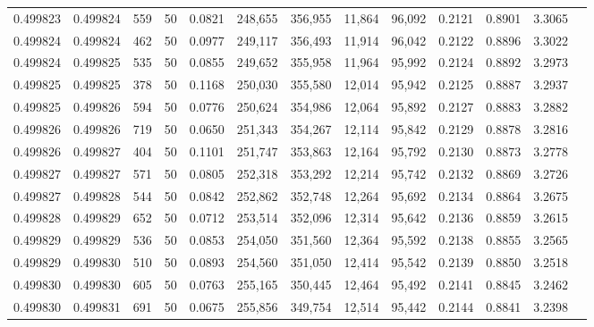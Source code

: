 \begin{tabular}{rrrrrrrrrrrrr}
0.499823 & 0.499824 &   559 &  50 &                                     0.0821 & 248,655 & 356,955 &  11,864 &  96,092 & 0.2121 & 0.8901 & 3.3065 \\
0.499824 & 0.499824 &   462 &  50 &                                     0.0977 & 249,117 & 356,493 &  11,914 &  96,042 & 0.2122 & 0.8896 & 3.3022 \\
0.499824 & 0.499825 &   535 &  50 &                                     0.0855 & 249,652 & 355,958 &  11,964 &  95,992 & 0.2124 & 0.8892 & 3.2973 \\
0.499825 & 0.499825 &   378 &  50 &                                     0.1168 & 250,030 & 355,580 &  12,014 &  95,942 & 0.2125 & 0.8887 & 3.2937 \\
0.499825 & 0.499826 &   594 &  50 &                                     0.0776 & 250,624 & 354,986 &  12,064 &  95,892 & 0.2127 & 0.8883 & 3.2882 \\
0.499826 & 0.499826 &   719 &  50 &                                     0.0650 & 251,343 & 354,267 &  12,114 &  95,842 & 0.2129 & 0.8878 & 3.2816 \\
0.499826 & 0.499827 &   404 &  50 &                                     0.1101 & 251,747 & 353,863 &  12,164 &  95,792 & 0.2130 & 0.8873 & 3.2778 \\
0.499827 & 0.499827 &   571 &  50 &                                     0.0805 & 252,318 & 353,292 &  12,214 &  95,742 & 0.2132 & 0.8869 & 3.2726 \\
0.499827 & 0.499828 &   544 &  50 &                                     0.0842 & 252,862 & 352,748 &  12,264 &  95,692 & 0.2134 & 0.8864 & 3.2675 \\
0.499828 & 0.499829 &   652 &  50 &                                     0.0712 & 253,514 & 352,096 &  12,314 &  95,642 & 0.2136 & 0.8859 & 3.2615 \\
0.499829 & 0.499829 &   536 &  50 &                                     0.0853 & 254,050 & 351,560 &  12,364 &  95,592 & 0.2138 & 0.8855 & 3.2565 \\
0.499829 & 0.499830 &   510 &  50 &                                     0.0893 & 254,560 & 351,050 &  12,414 &  95,542 & 0.2139 & 0.8850 & 3.2518 \\
0.499830 & 0.499830 &   605 &  50 &                                     0.0763 & 255,165 & 350,445 &  12,464 &  95,492 & 0.2141 & 0.8845 & 3.2462 \\
0.499830 & 0.499831 &   691 &  50 &                                     0.0675 & 255,856 & 349,754 &  12,514 &  95,442 & 0.2144 & 0.8841 & 3.2398 \\

\end{tabular}
